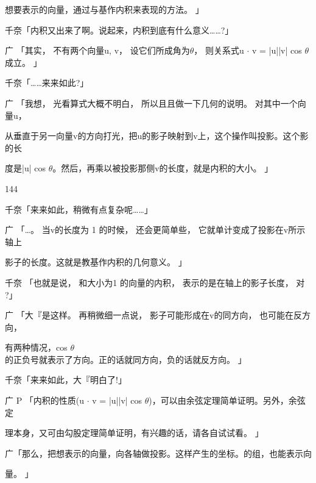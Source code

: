想要表示的向量，通过与基作内积来表现的方法。 」\par
千奈「内积又出来了啊。说起来，内积到底有什么意义……?」\par
广 「其实， 不有两个向量u, v， 设它们所成角为$\theta$， 则关系式u $\cdot$ v = |u||v| cos $\theta$成立。 」\par
千奈「……来来如此?」\par
广 「我想， 光看算式大概不明白， 所以且且做一下几何的说明。 对其中一个向量u，\par
从垂直于另一向量v的方向打光，把u的影子映射到v上，这个操作叫投影。这个影的长\par
度是|u| cos $\theta$。然后，再乘以被投影那侧v的长度，就是内积的大小。 」\par

144\par
千奈「来来如此，稍微有点复杂呢……」\par
广 「…。 当v的长度为 1 的时候， 还会更简单些， 它就单计变成了投影在v所示轴上\par
影子的长度。这就是教基作内积的几何意义。 」\par
千奈 「也就是说， 和大小为1 的向量的内积， 表示的是在轴上的影子长度， 对 ?」\par
广 「大『是这样。 再稍微细一点说， 影子可能形成在v的同方向， 也可能在反方向，\par
有两种情况，cos $\theta$的正负号就表示了方向。正的话就同方向，负的话就反方向。 」\par
千奈「来来如此，大『明白了!」\par
广 P 「内积的性质(u $\cdot$ v = |u||v| cos $\theta$)，可以由余弦定理简单证明。另外，余弦定\par
理本身，又可由勾股定理简单证明，有兴趣的话，请各自试试看。 」\par
广「那么，把想表示的向量，向各轴做投影。这样产生的坐标。的组，也能表示向\par
量。 」\par


